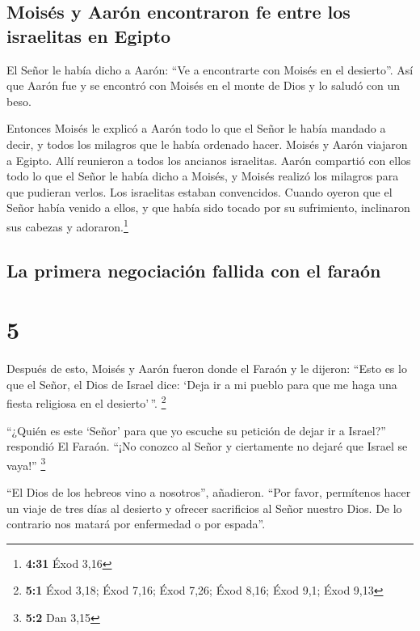 \hypertarget{moisuxe9s-y-aaruxf3n-encontraron-fe-entre-los-israelitas-en-egipto}{%
\subsection{Moisés y Aarón encontraron fe entre los israelitas en
Egipto}\label{moisuxe9s-y-aaruxf3n-encontraron-fe-entre-los-israelitas-en-egipto}}

 El Señor le había dicho a Aarón: ``Ve a encontrarte con
Moisés en el desierto''. Así que Aarón fue y se encontró con Moisés en
el monte de Dios y lo saludó con un beso.

 Entonces Moisés le explicó a Aarón todo lo que el Señor
le había mandado a decir, y todos los milagros que le había ordenado
hacer.  Moisés y Aarón viajaron a Egipto. Allí reunieron
a todos los ancianos israelitas.  Aarón compartió con
ellos todo lo que el Señor le había dicho a Moisés, y Moisés realizó los
milagros para que pudieran verlos.  Los israelitas
estaban convencidos. Cuando oyeron que el Señor había venido a ellos, y
que había sido tocado por su sufrimiento, inclinaron sus cabezas y
adoraron.\footnote{\textbf{4:31} Éxod 3,16}

\hypertarget{la-primera-negociaciuxf3n-fallida-con-el-farauxf3n}{%
\subsection{La primera negociación fallida con el
faraón}\label{la-primera-negociaciuxf3n-fallida-con-el-farauxf3n}}

\hypertarget{section-4}{%
\section{5}\label{section-4}}

 Después de esto, Moisés y Aarón fueron donde el Faraón y
le dijeron: ``Esto es lo que el Señor, el Dios de Israel dice: `Deja ir
a mi pueblo para que me haga una fiesta religiosa en el desierto'\,''.
\footnote{\textbf{5:1} Éxod 3,18; Éxod 7,16; Éxod 7,26; Éxod 8,16; Éxod
  9,1; Éxod 9,13}

 ``¿Quién es este `Señor' para que yo escuche su petición
de dejar ir a Israel?'' respondió El Faraón. ``¡No conozco al Señor y
ciertamente no dejaré que Israel se vaya!'' \footnote{\textbf{5:2} Dan
  3,15}

 ``El Dios de los hebreos vino a nosotros'', añadieron.
``Por favor, permítenos hacer un viaje de tres días al desierto y
ofrecer sacrificios al Señor nuestro Dios. De lo contrario nos matará
por enfermedad o por espada''.

